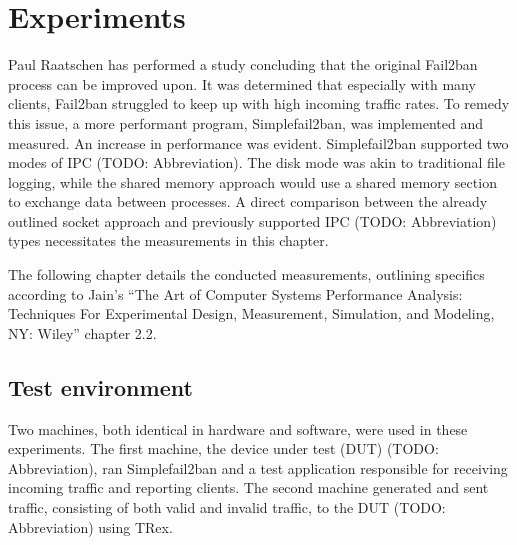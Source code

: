 %
%

\chapter{Experiments}\label{cha:experiments}
Paul Raatschen has performed a study\cite{raatschen:ipc} concluding that the original Fail2ban process can be improved upon.
It was determined that especially with many clients, Fail2ban struggled to keep up with high incoming traffic rates.
To remedy this issue, a more performant program, Simplefail2ban, was implemented and measured.
An increase in performance was evident.
Simplefail2ban supported two modes of IPC (TODO: Abbreviation).
The disk mode was akin to traditional file logging, while the shared memory approach would use a shared memory section to exchange data between processes.
A direct comparison between the already outlined socket approach and previously supported IPC (TODO: Abbreviation) types necessitates the measurements in this chapter.

The following chapter details the conducted measurements, outlining specifics according to Jain's
``The Art of Computer Systems Performance Analysis: Techniques For Experimental Design, Measurement, Simulation, and Modeling, NY\@: Wiley''\cite{jain:measurement} chapter 2.2.

\section{Test environment}
Two machines, both identical in hardware and software, were used in these experiments.
The first machine, the device under test (DUT) (TODO: Abbreviation), ran Simplefail2ban and a test application responsible for receiving incoming traffic and reporting clients.
The second machine generated and sent traffic, consisting of both valid and invalid traffic, to the DUT (TODO: Abbreviation) using TRex.

